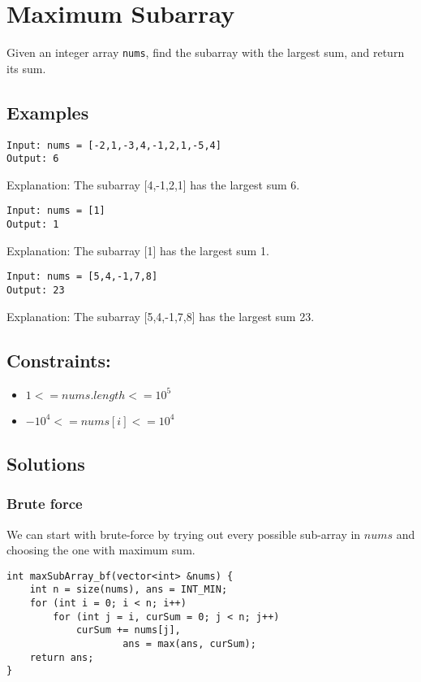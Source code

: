 \documentclass[11pt]{article}
\begin{document}
\section{Maximum Subarray}
\label{sec:orgca113dc}
Given an integer array \texttt{nums}, find the  subarray with the largest sum, and return its sum.

\subsection{Examples}
\label{sec:org10e54e6}
\begin{verbatim}
Input: nums = [-2,1,-3,4,-1,2,1,-5,4]
Output: 6
\end{verbatim}

Explanation: The subarray [4,-1,2,1] has the largest sum 6.

\begin{verbatim}
Input: nums = [1]
Output: 1
\end{verbatim}

Explanation: The subarray [1] has the largest sum 1.

\begin{verbatim}
Input: nums = [5,4,-1,7,8]
Output: 23
\end{verbatim}
Explanation: The subarray [5,4,-1,7,8] has the largest sum 23.

\subsection{Constraints:}
\label{sec:org0c526b5}
\begin{itemize}
\item \(1 <= nums.length <= 10^5\)
\item \(-10^4 <= nums[i] <= 10^4\)
\end{itemize}

\subsection{Solutions}
\label{sec:org6287c90}
\subsubsection{Brute force}
\label{sec:org0f15b0e}
We can start with brute-force by trying out every possible sub-array in \(nums\) and choosing the one with maximum sum.

\begin{verbatim}
int maxSubArray_bf(vector<int> &nums) {
    int n = size(nums), ans = INT_MIN;
    for (int i = 0; i < n; i++)
        for (int j = i, curSum = 0; j < n; j++)
            curSum += nums[j],
                    ans = max(ans, curSum);
    return ans;
}
\end{verbatim}
\end{document}
